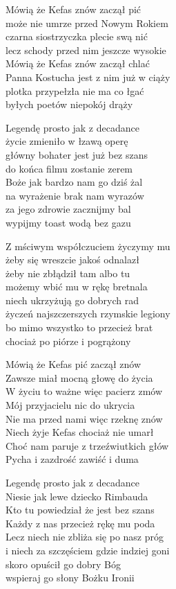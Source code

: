 \begin{text}
    Mówią że Kefas znów zaczął pić\\
    może nie umrze przed Nowym Rokiem\\
    czarna siostrzyczka plecie swą nić\\
    lecz schody przed nim jeszcze wysokie\\
    Mówią że Kefas znów zaczął chlać\\
    Panna Kostucha jest z nim już w ciąży\\
    plotka przypełzła nie ma co łgać\\
    byłych poetów niepokój drąży

    Legendę prosto jak z decadance\\
    życie zmieniło w łzawą operę\\
    główny bohater jest już bez szans\\
    do końca filmu zostanie zerem\\
    Boże jak bardzo nam go dziś żal\\
    na wyrażenie brak nam wyrazów\\
    za jego zdrowie zacznijmy bal\\
    wypijmy toast wodą bez gazu

    Z mściwym współczuciem życzymy mu\\
    żeby się wreszcie jakoś odnalazł\\
    żeby nie zbłądził tam albo tu\\
    możemy wbić mu w rękę bretnala\\
    niech ukrzyżują go dobrych rad\\
    życzeń najszczerszych rzymskie legiony\\
    bo mimo wszystko to przecież brat\\
    chociaż po piórze i pogrążony

    Mówią że Kefas pić zaczął znów\\
    Zawsze miał mocną głowę do życia\\
    W życiu to ważne więc pacierz zmów\\
    Mój przyjacielu nic do ukrycia\\
    Nie ma przed nami więc rzeknę znów\\
    Niech żyje Kefas chociaż nie umarł\\
    Choć nam paruje z trzeźwiutkich głów\\
    Pycha i zazdrość zawiść i duma

    Legendę prosto jak z decadance\\
    Niesie jak lewe dziecko Rimbauda\\
    Kto tu powiedział że jest bez szans\\
    Każdy z nas przecież rękę mu poda\\
    Lecz niech nie zbliża się po nasz próg\\
    i niech za szczęściem gdzie indziej goni\\
    skoro opuścił go dobry Bóg\\
    wspieraj go słony Bożku Ironii
\end{text}
\begin{chord}

\end{chord}